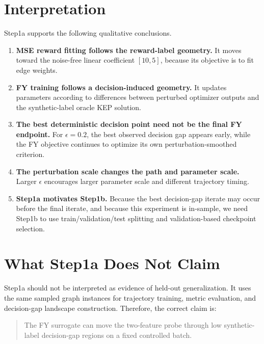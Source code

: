 \documentclass[11pt]{article}
\begin{document}
\section{Interpretation}

Step1a supports the following qualitative conclusions.

\begin{enumerate}
    \item \textbf{MSE reward fitting follows the reward-label geometry.}
    It moves toward the noise-free linear coefficient \([10,5]\), because its
    objective is to fit edge weights.

    \item \textbf{FY training follows a decision-induced geometry.}
    It updates parameters according to differences between perturbed optimizer
    outputs and the synthetic-label oracle KEP solution.

    \item \textbf{The best deterministic decision point need not be the final FY
    endpoint.}
    For \(\epsilon=0.2\), the best observed decision gap appears early, while the
    FY objective continues to optimize its own perturbation-smoothed criterion.

    \item \textbf{The perturbation scale changes the path and parameter scale.}
    Larger \(\epsilon\) encourages larger parameter scale and different
    trajectory timing.

    \item \textbf{Step1a motivates Step1b.}
    Because the best decision-gap iterate may occur before the final iterate,
    and because this experiment is in-sample, we need Step1b to use
    train/validation/test splitting and validation-based checkpoint selection.
\end{enumerate}

\section{What Step1a Does Not Claim}

Step1a should not be interpreted as evidence of held-out generalization. It uses
the same sampled graph instances for trajectory training, metric evaluation, and
decision-gap landscape construction. Therefore, the correct claim is:

\begin{quote}
The FY surrogate can move the two-feature probe through low synthetic-label
decision-gap regions on a fixed controlled batch.
\end{quote}
\end{document}
